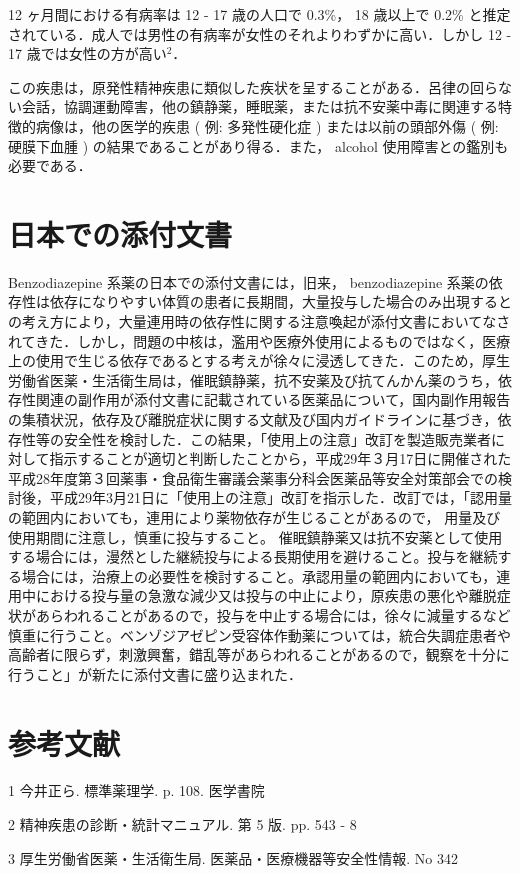 \documentclass[11pt,dvipdfmx,uplatex]{jsarticle}
\begin{document}
12 ヶ月間における有病率は 12 - 17 歳の人口で 0.3\%， 18 歳以上で 0.2\% と推定されている．成人では男性の有病率が女性のそれよりわずかに高い．しかし 12 - 17 歳では女性の方が高い$^2$．

この疾患は，原発性精神疾患に類似した疾状を呈することがある．呂律の回らない会話，協調運動障害，他の鎮静薬，睡眠薬，または抗不安薬中毒に関連する特徴的病像は，他の医学的疾患 ( 例: 多発性硬化症 ) または以前の頭部外傷 ( 例: 硬膜下血腫 ) の結果であることがあり得る．また， alcohol 使用障害との鑑別も必要である．


\section{日本での添付文書}

Benzodiazepine 系薬の日本での添付文書には，旧来， benzodiazepine 系薬の依存性は依存になりやすい体質の患者に長期間，大量投与した場合のみ出現するとの考え方により，大量連用時の依存性に関する注意喚起が添付文書においてなされてきた．しかし，問題の中核は，濫用や医療外使用によるものではなく，医療上の使用で生じる依存であるとする考えが徐々に浸透してきた．このため，厚生労働省医薬・生活衛生局は，催眠鎮静薬，抗不安薬及び抗てんかん薬のうち，依存性関連の副作用が添付文書に記載されている医薬品について，国内副作用報告の集積状況，依存及び離脱症状に関する文献及び国内ガイドラインに基づき，依存性等の安全性を検討した．この結果，「使用上の注意」改訂を製造販売業者に対して指示することが適切と判断したことから，平成29年３月17日に開催された平成28年度第３回薬事・食品衛生審議会薬事分科会医薬品等安全対策部会での検討後，平成29年3月21日に「使用上の注意」改訂を指示した．改訂では，「認用量の範囲内においても，連用により薬物依存が生じることがあるので， 用量及び使用期間に注意し，慎重に投与すること。 催眠鎮静薬又は抗不安薬として使用する場合には，漫然とした継続投与による長期使用を避けること。投与を継続する場合には，治療上の必要性を検討すること。承認用量の範囲内においても，連用中における投与量の急激な減少又は投与の中止により，原疾患の悪化や離脱症状があらわれることがあるので，投与を中止する場合には，徐々に減量するなど慎重に行うこと。ベンゾジアゼピン受容体作動薬については，統合失調症患者や高齢者に限らず，刺激興奮，錯乱等があらわれることがあるので，観察を十分に行うこと」が新たに添付文書に盛り込まれた．

\section*{参考文献}

1 今井正ら. 標準薬理学. p. 108. 医学書院

2 精神疾患の診断・統計マニュアル. 第 5 版. pp. 543 - 8

3 厚生労働省医薬・生活衛生局. 医薬品・医療機器等安全性情報. No 342
\end{document}
